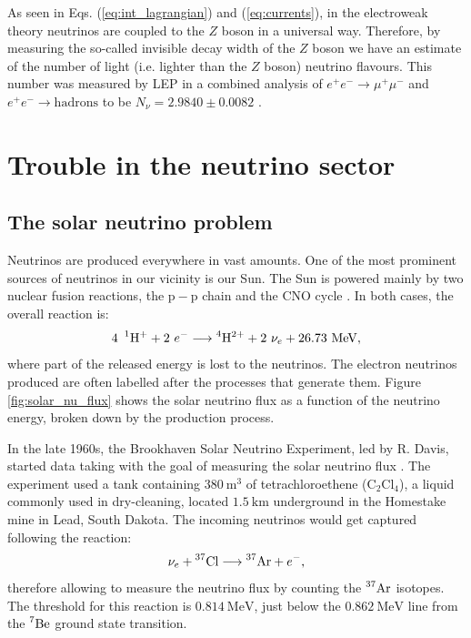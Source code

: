 As seen in Eqs. (\ref{eq:int_lagrangian}) and (\ref{eq:currents}), in the electroweak theory neutrinos are coupled to the $Z$ boson in a universal way. Therefore, by measuring the so-called invisible decay width of the $Z$ boson we have an estimate of the number of light (i.e. lighter than the $Z$ boson) neutrino flavours. This number was measured by LEP in a combined analysis of $e^{+}e^{-} \rightarrow \mu^{+}\mu^{-}$ and $e^{+}e^{-} \rightarrow \mathrm{hadrons}$ to be $N_{\nu} = 2.9840 \pm 0.0082$ \cite{ALEPH2005}.

\section{Trouble in the neutrino sector}\label{sec:nu_trouble}

\subsection{The solar neutrino problem}

Neutrinos are produced everywhere in vast amounts. One of the most prominent sources of neutrinos in our vicinity is our Sun. The Sun is powered mainly by two nuclear fusion reactions, the $\mathrm{p}-\mathrm{p}$ chain and the CNO cycle \cite{Adelberger2010}. In both cases, the overall reaction is:
\begin{equation}
	4~\prescript{1}{}{\mathrm{H}}^{+}+2~e^{-} \longrightarrow \prescript{4}{}{\mathrm{H}}^{2+} + 2~\nu_{e} + 26.73~\mathrm{MeV},
\end{equation}
where part of the released energy is lost to the neutrinos. The electron neutrinos produced are often labelled after the processes that generate them. Figure \ref{fig:solar_nu_flux} shows the solar neutrino flux as a function of the neutrino energy, broken down by the production process.

In the late 1960s, the Brookhaven Solar Neutrino Experiment, led by R. Davis, started data taking with the goal of measuring the solar neutrino flux \cite{Davis1968}. The experiment used a tank containing $380~\mathrm{m}^{3}$ of tetrachloroethene ($\mathrm{C}_{2}\mathrm{Cl}_{4}$), a liquid commonly used in dry-cleaning, located $1.5~\mathrm{km}$ underground in the Homestake mine in Lead, South Dakota. The incoming neutrinos would get captured following the reaction:
\begin{equation}
	\nu_{e} + \prescript{37}{}{\mathrm{Cl}} \longrightarrow \prescript{37}{}{\mathrm{Ar}} + e^{-},
\end{equation}
therefore allowing to measure the neutrino flux by counting the $\prescript{37}{}{\mathrm{Ar}}$ isotopes. The threshold for this reaction is $0.814~\mathrm{MeV}$, just below the $0.862~\mathrm{MeV}$ line from the $\prescript{7}{}{\mathrm{Be}}$ ground state transition.

